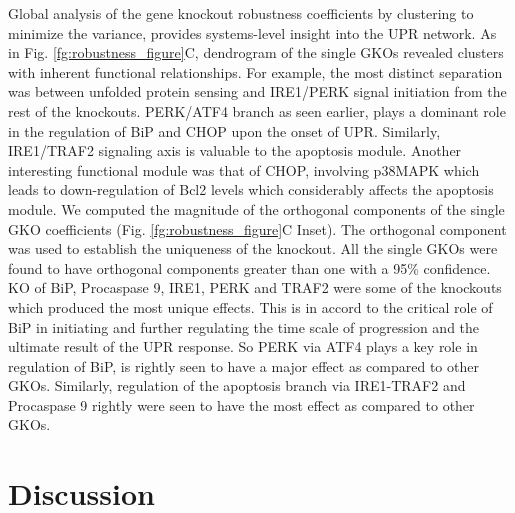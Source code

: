 \documentclass[fleqn,10pt]{wlscirep}
\begin{document}
Global analysis of the gene knockout robustness coefficients by clustering to minimize the variance, provides systems-level insight into the UPR network. As in Fig. \ref{fg:robustness_figure}C, dendrogram of the single GKOs revealed clusters with inherent functional relationships. For example, the most distinct separation was between unfolded protein sensing and IRE1/PERK signal initiation from the rest of the knockouts. PERK/ATF4 branch as seen earlier, plays a dominant role in the regulation of BiP and CHOP upon the onset of UPR. Similarly, IRE1/TRAF2 signaling axis is valuable to the apoptosis module. Another interesting functional module was that of CHOP, involving p38MAPK which leads to down-regulation of Bcl2 levels which considerably affects the apoptosis module. We computed the magnitude of the orthogonal components of the single GKO coefficients (Fig. \ref{fg:robustness_figure}C Inset). The orthogonal component was used to establish the uniqueness of the knockout. All the single GKOs were found to have orthogonal components greater than one with a 95\% confidence. KO of BiP, Procaspase 9, IRE1, PERK and TRAF2 were some of the knockouts which produced the most unique effects. This is in accord to the critical role of BiP in initiating and further regulating the time scale of progression and the ultimate result of the UPR response. So PERK via ATF4 plays a key role in regulation of BiP, is rightly seen to have a major effect as compared to other GKOs. Similarly, regulation of the apoptosis branch via IRE1-TRAF2 and Procaspase 9 rightly were seen to have the most effect as compared to other GKOs. 


\section*{Discussion}
\end{document}

